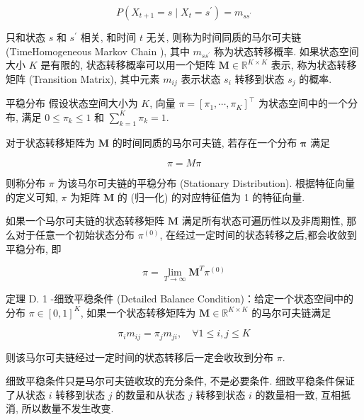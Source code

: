 \documentclass[10pt]{article}
\begin{document}
\begin{equation*}
P\left(X_{t+1}=s \mid X_{t}=s^{\prime}\right)=m_{s s^{\prime}} \tag{D.46}
\end{equation*}


只和状态 $s$ 和 $s^{\prime}$ 相关, 和时间 $t$ 无关, 则称为时间同质的马尔可夫链 (TimeHomogeneous Markov Chain ), 其中 $m_{s s^{\prime}}$ 称为状态转移概率. 如果状态空间大小 $K$ 是有限的, 状态转移概率可以用一个矩阵 $\boldsymbol{M} \in \mathbb{R}^{K \times K}$ 表示, 称为状态转移矩阵 (Transition Matrix), 其中元素 $m_{i j}$ 表示状态 $s_{i}$ 转移到状态 $s_{j}$ 的概率.

平稳分布 假设状态空间大小为 $K$, 向量 $\pi=\left[\pi_{1}, \cdots, \pi_{K}\right]^{\top}$ 为状态空间中的一个分布, 满足 $0 \leq \pi_{k} \leq 1$ 和 $\sum_{k=1}^{K} \pi_{k}=1$.

对于状态转移矩阵为 $\boldsymbol{M}$ 的时间同质的马尔可夫链, 若存在一个分布 $\boldsymbol{\pi}$ 满足


\begin{equation*}
\pi=M \pi \tag{D.47}
\end{equation*}


则称分布 $\pi$ 为该马尔可夫链的平稳分布 (Stationary Distribution). 根据特征向量的定义可知, $\pi$ 为矩阵 $\boldsymbol{M}$ 的 (归一化) 的对应特征值为 1 的特征向量.

如果一个马尔可夫链的状态转移矩阵 $\boldsymbol{M}$ 满足所有状态可遍历性以及非周期性, 那么对于任意一个初始状态分布 $\pi^{(0)}$, 在经过一定时间的状态转移之后,都会收敛到平稳分布, 即


\begin{equation*}
\pi=\lim _{T \rightarrow \infty} \boldsymbol{M}^{T} \pi^{(0)} \tag{D.48}
\end{equation*}


定理 D. 1 -细致平稳条件 (Detailed Balance Condition)：给定一个状态空间中的分布 $\pi \in[0,1]^{K}$, 如果一个状态转移矩阵为 $\boldsymbol{M} \in \mathbb{R}^{K \times K}$ 的马尔可夫链满足


\begin{equation*}
\pi_{i} m_{i j}=\pi_{j} m_{j i}, \quad \forall 1 \leq i, j \leq K \tag{D.49}
\end{equation*}


则该马尔可夫链经过一定时间的状态转移后一定会收玫到分布 $\pi$.

细致平稳条件只是马尔可夫链收玫的充分条件, 不是必要条件. 细致平稳条件保证了从状态 $i$ 转移到状态 $j$ 的数量和从状态 $j$ 转移到状态 $i$ 的数量相一致, 互相抵消, 所以数量不发生改变.
\end{document}
